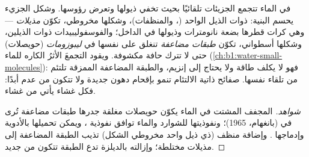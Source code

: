 \begin{proposition}\label{prop:b1:lipids:selfassembly}
في الماء تتجمع الجزيئات  تلقائيًا بحيث تخفي ذيولها
وتعرض رؤوسها. وشكل الجزيء يحسم البنية:  ذوات الذيل الواحد
(، والمنظفات)، وشكلها مخروطي، تكوّن \emph{مذيلات} ---
وهي كرات قطرها بضعة نانومترات وذيولها في الداخل؛ والفوسفوليبيدات ذوات
الذيلين، وشكلها أسطواني، تكوّن \emph{طبقات مضاعفة} تنغلق على نفسها
في \emph{ليبوزومات} (حويصلات) حتى لا تترك حافة مكشوفة. ويقود
التجمعَ الأثرُ الكاره للماء (\cref{ch:b1:water-small-molecules}): فهو
لا يكلف طاقة ولا يحتاج إلى إنزيم، والطبقة المضاعفة الممزقة تلتئم من
تلقاء نفسها.  صفائح ذاتية الالتئام تنمو بإقحام دهون جديدة
ولا تتكون من عدم أبدًا: فكل غشاء يأتي من غشاء.
\end{proposition}
\begin{proof}[شواهد]
 المجفف المشتت في الماء يكوّن حويصلات مغلقة جدرها طبقات
مضاعفة تُرى في  (بانغهام، 1965)؛ ونفوذيتها للشوارد
والماء توافق نفوذية  ، ويمكن تحميلها بالأدوية وإدماجها
. وإضافة منظف (ذي ذيل واحد مخروطي الشكل) تذيب الطبقة
المضاعفة إلى مذيلات مختلطة؛ وإزالته بالديلزة تدع الطبقة تتكون من
جديد.
\end{proof}

